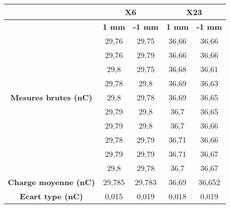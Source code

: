 \documentclass{article}
\begin{document}
\begin{table}[h]
  \centering
  \begin{tabular}{c|cc|cc|}
  \cline{2-5}
                                                           & \multicolumn{2}{c|}{\textbf{X6}} & \multicolumn{2}{c|}{\textbf{X23}} \\ \hline
  \multicolumn{1}{|c|}{\multirow{11}{*}{\textbf{Mesures brutes (nC)}}} & \textbf{1 mm} & \textbf{-1 mm} & \textbf{1 mm} & \textbf{-1 mm} \\ \cline{2-5} 
  \multicolumn{1}{|c|}{}                                   & 29,76           & 29,75          & 36,66           & 36,66           \\
  \multicolumn{1}{|c|}{}                                   & 29,76           & 29,79          & 36,66           & 36,66           \\
  \multicolumn{1}{|c|}{}                                   & 29,8            & 29,75          & 36,68           & 36,61           \\
  \multicolumn{1}{|c|}{}                                   & 29,78           & 29,8           & 36,69           & 36,63           \\
  \multicolumn{1}{|c|}{}                                   & 29,8            & 29,78          & 36,69           & 36,65           \\
  \multicolumn{1}{|c|}{}                                   & 29,79           & 29,8           & 36,7            & 36,65           \\
  \multicolumn{1}{|c|}{}                                   & 29,79           & 29,8           & 36,7            & 36,66           \\
  \multicolumn{1}{|c|}{}                                   & 29,78           & 29,79          & 36,71           & 36,66           \\
  \multicolumn{1}{|c|}{}                                   & 29,79           & 29,79          & 36,71           & 36,67           \\
  \multicolumn{1}{|c|}{}                                   & 29,8            & 29,78          & 36,7            & 36,67           \\ \hline
  \multicolumn{1}{|c|}{\textbf{Charge moyenne   (nC)}}     & 29,785          & 29,783         & 36,69           & 36,652          \\
  \multicolumn{1}{|c|}{\textbf{Ecart type (nC)}}           & 0,015           & 0,019          & 0,018           & 0,019           \\ \hline

\end{tabular}
\end{table}
\end{document}
